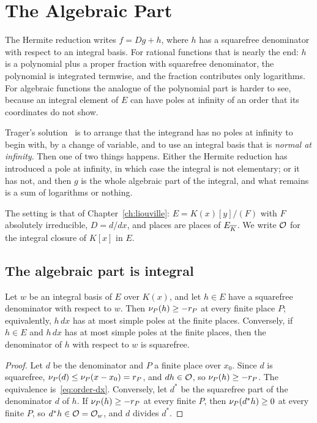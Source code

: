 \chapter{The Algebraic Part}\label{ch:algebraic-part}

The Hermite reduction writes $f = Dg + h$, where $h$ has a squarefree
denominator with respect to an integral basis. For rational functions that is
nearly the end: $h$ is a polynomial plus a proper fraction with squarefree
denominator, the polynomial is integrated termwise, and the fraction
contributes only logarithms. For algebraic functions the analogue of the
polynomial part is harder to see, because an integral element of $E$ can have
poles at infinity of an order that its coordinates do not show.

Trager's solution~\cite[\S4.3]{trager1984} is to arrange that the integrand
has no poles at infinity to begin with, by a change of variable, and to use an
integral basis that is \emph{normal at infinity}. Then one of two things
happens. Either the Hermite reduction has introduced a pole at infinity, in
which case the integral is not elementary; or it has not, and then $g$ is
the whole algebraic part of the integral, and what remains is a sum of
logarithms or nothing.

The setting is that of Chapter~\ref{ch:liouville}: $E = K(x)[y]/(F)$ with $F$
absolutely irreducible, $D = d/dx$, and places are places of $E_{\overline{K}}$. We
write $\mathcal{O}$ for the integral closure of $K[x]$ in $E$.

\section{The algebraic part is integral}\label{sec:algpart-integral}

\begin{lemma}\label{lem:simple-poles}
Let $w$ be an integral basis of $E$ over $K(x)$, and let $h \in E$ have a
squarefree denominator with respect to $w$. Then $\nu_{P}(h) \ge -r_P$ at
every finite place $P$; equivalently, $h\,dx$ has at most simple poles at the
finite places. Conversely, if $h \in E$ and $h\,dx$ has at most simple poles
at the finite places, then the denominator of $h$ with respect to $w$ is
squarefree.
\end{lemma}

\begin{proof}
Let $d$ be the denominator and $P$ a finite place over $x_0$. Since $d$ is
squarefree, $\nu_{P}(d) \le \nu_{P}(x - x_0) = r_P$, and $d h \in \mathcal{O}$, so
$\nu_{P}(h) \ge -r_P$. The equivalence is~\eqref{eq:order-dx}. Conversely,
let $d^*$ be the squarefree part of the denominator $d$ of $h$. If
$\nu_{P}(h) \ge -r_P$ at every finite $P$, then $\nu_{P}(d^* h) \ge 0$ at
every finite $P$, so $d^* h \in \mathcal{O} = \mathcal{O}_w$, and $d$ divides $d^*$.
\end{proof}

